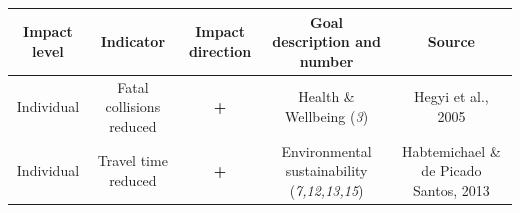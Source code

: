 \documentclass[
]{book}
\begin{document}
\begin{longtable}[]{@{}ccccc@{}}
\toprule
\begin{minipage}[b]{0.17\columnwidth}\centering
Impact level\strut
\end{minipage} & \begin{minipage}[b]{0.16\columnwidth}\centering
Indicator\strut
\end{minipage} & \begin{minipage}[b]{0.17\columnwidth}\centering
Impact direction\strut
\end{minipage} & \begin{minipage}[b]{0.17\columnwidth}\centering
Goal description and number\strut
\end{minipage} & \begin{minipage}[b]{0.17\columnwidth}\centering
Source\strut
\end{minipage}\tabularnewline
\midrule
\endhead
\begin{minipage}[t]{0.17\columnwidth}\centering
Individual\strut
\end{minipage} & \begin{minipage}[t]{0.16\columnwidth}\centering
Fatal collisions reduced\strut
\end{minipage} & \begin{minipage}[t]{0.17\columnwidth}\centering
\textbf{+}\strut
\end{minipage} & \begin{minipage}[t]{0.17\columnwidth}\centering
Health \& Wellbeing (\emph{3})\strut
\end{minipage} & \begin{minipage}[t]{0.17\columnwidth}\centering
Hegyi et al., 2005\strut
\end{minipage}\tabularnewline
\begin{minipage}[t]{0.17\columnwidth}\centering
Individual\strut
\end{minipage} & \begin{minipage}[t]{0.16\columnwidth}\centering
Travel time reduced\strut
\end{minipage} & \begin{minipage}[t]{0.17\columnwidth}\centering
\textbf{+}\strut
\end{minipage} & \begin{minipage}[t]{0.17\columnwidth}\centering
Environmental sustainability (\emph{7,12,13,15})\strut
\end{minipage} & \begin{minipage}[t]{0.17\columnwidth}\centering
Habtemichael \& de Picado Santos, 2013\strut

\end{minipage}
\end{longtable}
\end{document}
